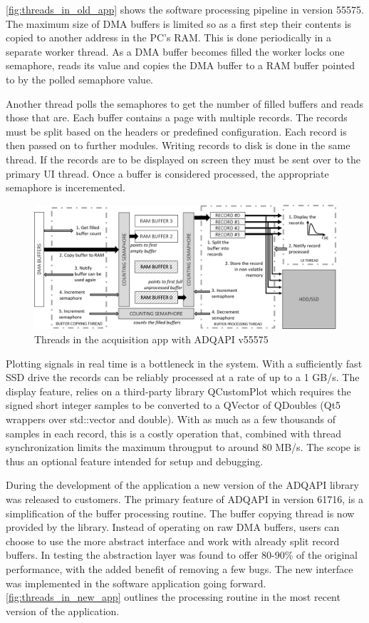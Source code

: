 \autoref{fig:threads_in_old_app} shows the software processing pipeline in version 55575.
The maximum size of DMA buffers is limited so as a first
step their contents is copied to another address in the PC's RAM.
This is done periodically in a separate worker thread.
As a DMA buffer becomes filled the worker locks one semaphore, reads its value
and copies the DMA buffer to a RAM buffer pointed to by the polled semaphore value.


Another thread polls the semaphores to get the number of filled buffers and 
reads those that are. Each buffer contains a page with multiple records.
The records must be split based on the headers or predefined configuration.
Each record is then passed on to further modules. Writing records to disk
is done in the same thread. If the records are to be displayed on screen
they must be sent over to the primary UI thread. 
Once a buffer is considered processed, the appropriate semaphore is inceremented.

\begin{figure}[H]
  \centering
  \includegraphics[width=\linewidth]{media/threads_in_old_app.png}
  \caption{Threads in the acquisition app with ADQAPI v55575}
  \label{fig:threads_in_old_app} 
\end{figure}

Plotting signals in real time is a bottleneck in the system. With a sufficiently fast
SSD drive the records can be reliably processed at a rate of up to a 1 GB/s.
The display feature, relies on a third-party library QCustomPlot which requires
the signed short integer samples to be converted to a QVector of QDoubles 
(Qt5 wrappers over std::vector and double).
With as much as a few thousands of samples in each record, this is a costly operation that,
combined with thread synchronization limits the maximum througput to around 80 MB/s.
The scope is thus an optional feature intended for setup and debugging.


During the development of the application a new version of the ADQAPI library
was released to customers. The primary feature of ADQAPI in version 61716,
is a simplification of the buffer processing routine. The buffer copying thread
is now provided by the library. Instead of operating on raw DMA buffers,
users can choose to use the more abstract interface and work with already
split record buffers. In testing the abstraction layer was found to offer 80-90\% 
of the original performance, with the added benefit of removing a few bugs.
The new interface was implemented in the software application going forward.
\autoref{fig:threads_in_new_app} outlines the processing routine in the most recent
version of the application.

